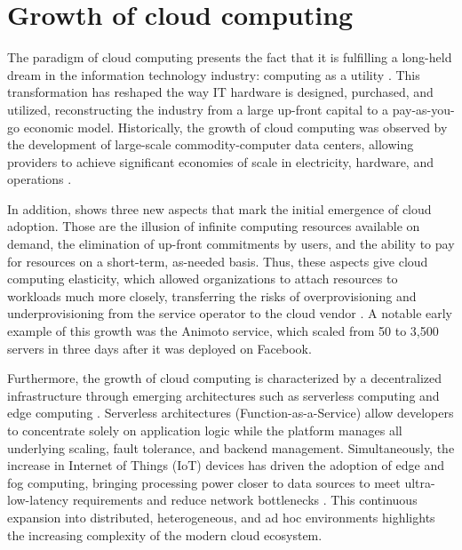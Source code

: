 \section{Growth of cloud computing}
\label{sec:Growth}
The paradigm of cloud computing presents the fact that it is fulfilling a long-held dream in the information technology industry: computing as a utility \cite{Armbrust:EECS-2009-28}. This transformation has reshaped the way IT hardware is designed, purchased, and utilized, reconstructing the industry from a large up-front capital to a pay-as-you-go economic model. Historically, the growth of cloud computing was observed by the development of large-scale commodity-computer data centers, allowing providers to achieve significant economies of scale in electricity, hardware, and operations \cite{Armbrust:EECS-2009-28}.
 
In addition, \cite{Armbrust:EECS-2009-28} shows three new aspects that mark the initial emergence of cloud adoption. Those are the illusion of infinite computing resources available on demand, the elimination of up-front commitments by users, and the ability to pay for resources on a short-term, as-needed basis. Thus, these aspects give cloud computing elasticity, which allowed organizations to attach resources to workloads much more closely, transferring the risks of overprovisioning and underprovisioning from the service operator to the cloud vendor \cite{Armbrust:EECS-2009-28}. A notable early example of this growth was the Animoto service, which scaled from 50 to 3,500 servers in three days after it was deployed on Facebook.

Furthermore, the growth of cloud computing is characterized by a decentralized infrastructure through emerging architectures such as serverless computing and edge computing \cite{varghese2022cloud}. Serverless architectures (Function-as-a-Service) allow developers to concentrate solely on application logic while the platform manages all underlying scaling, fault tolerance, and backend management. Simultaneously, the increase in Internet of Things (IoT) devices has driven the adoption of edge and fog computing, bringing processing power closer to data sources to meet ultra-low-latency requirements and reduce network bottlenecks \cite{varghese2022cloud}. This continuous expansion into distributed, heterogeneous, and ad hoc environments highlights the increasing complexity of the modern cloud ecosystem.

